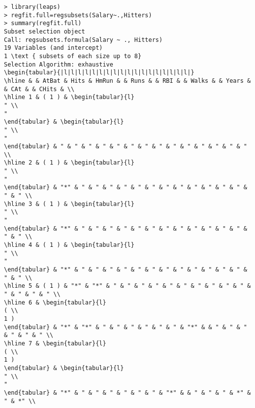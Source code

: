 \documentclass[10pt]{article}
\begin{document}
\begin{verbatim}
> library(leaps)
> regfit.full=regsubsets(Salary~.,Hitters)
> summary(regfit.full)
Subset selection object
Call: regsubsets.formula(Salary ~ ., Hitters)
19 Variables (and intercept)
1 \text { subsets of each size up to 8}
Selection Algorithm: exhaustive
\begin{tabular}{|l|l|l|l|l|l|l|l|l|l|l|l|l|l|l|l|l|l|}
\hline & & AtBat & Hits & HmRun & & Runs & & RBI & & Walks & & Years & & CAt & & CHits & \\
\hline 1 & ( 1 ) & \begin{tabular}{l}
" \\
"
\end{tabular} & \begin{tabular}{l}
" \\
"
\end{tabular} & " & " & " & " & " & " & " & " & " & " & " & " & " & " \\
\hline 2 & ( 1 ) & \begin{tabular}{l}
" \\
"
\end{tabular} & "*" & " & " & " & " & " & " & " & " & " & " & " & " & " & " \\
\hline 3 & ( 1 ) & \begin{tabular}{l}
" \\
"
\end{tabular} & "*" & " & " & " & " & " & " & " & " & " & " & " & " & " & " \\
\hline 4 & ( 1 ) & \begin{tabular}{l}
" \\
"
\end{tabular} & "*" & " & " & " & " & " & " & " & " & " & " & " & " & " & " \\
\hline 5 & ( 1 ) & "*" & "*" & " & " & " & " & " & " & " & " & " & " & " & " & " & " \\
\hline 6 & \begin{tabular}{l}
( \\
1 )
\end{tabular} & "*" & "*" & " & " & " & " & " & " & "*" & & " & " & " & " & " & " \\
\hline 7 & \begin{tabular}{l}
( \\
1 )
\end{tabular} & \begin{tabular}{l}
" \\
"
\end{tabular} & "*" & " & " & " & " & " & " & "*" & & " & " & " & *" & " & *" \\

\end{verbatim}
\end{document}
